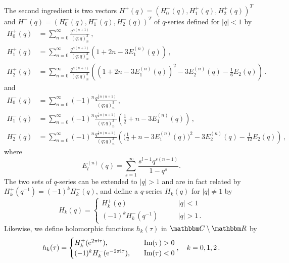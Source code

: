 \documentclass[12pt,reqno]{amsart}
\theoremstyle{definition}
\def\BR{\mathbbm R}
\def\BC{\mathbbm C}
\def\ri{\mathrm{i}}
\def\re{{\rm e}}
\def\ri{{\rm i}}
\def\Im{\mathrm{Im}}
\begin{document}
The second ingredient is two vectors
$H^+(q)= (H^+_0(q), H^+_1(q), H^+_2(q))^T$ and
$H^-(q) = (H^-_0(q),H^-_1(q),H^-_2(q))^T$ of $q$-series defined for
$|q|<1$ by
\begin{subequations}
\begin{align}
\label{Hp0}
  H^+_0(q)
  &=\sum_{n=0}^\infty \frac{q^{n(n+1)}}{(q;q)_n^3}\,,
\\
\label{Hp1}
  H^+_1(q)
  &=\sum_{n=0}^\infty \frac{q^{n(n+1)}}{(q;q)_n^3}
    \left(1+2n-3E_1^{(n)}(q)\right) \,,
  \\
  \label{Hp2}
  H^+_2(q)
  &=\sum_{n=0}^\infty \frac{q^{n(n+1)}}{(q;q)_n^3}
    \left((1+2n-3E_1^{(n)}(q))^2-3E_2^{(n)}(q)-\frac{1}{6}E_2(q)\right) \,.
\end{align}
\end{subequations}
and
\begin{subequations}
\begin{align}
\label{Hn0}
  H^-_0(q)
  &=\sum_{n=0}^\infty (-1)^n\frac{q^{\frac{1}{2}n(n+1)}}{(q;q)_n^3}\,,
\\
\label{Hn1}
  H^-_1(q)
  &=\sum_{n=0}^\infty (-1)^n\frac{q^{\frac{1}{2}n(n+1)}}{(q;q)_n^3}
    \left(\frac{1}{2}+n-3E_1^{(n)}(q)\right) \,,
  \\
  \label{Hn2}
  H^-_2(q)
  &=\sum_{n=0}^\infty (-1)^n\frac{q^{\frac{1}{2}n(n+1)}}{(q;q)_n^3}
  \left(\big(\frac{1}{2}+n-3E_1^{(n)}(q)\big)^2
    -3E_2^{(n)}(q)-\frac{1}{12}E_2(q)\right) \,,
\end{align}
\end{subequations}
where
\begin{equation}
  E_l^{(n)}(q) = \sum_{s=1}^\infty \frac{s^{l-1}q^{s(n+1)}}{1-q^s}.
  \label{eq:Eln}
\end{equation}
The two sets of $q$-series can be extended to $|q|>1$ and are in fact
related by $H^+_k(q^{-1})=(-1)^k H^-_k(q)$, and define a $q$-series
$H_k(q)$ for $|q| \neq 1$ by
\begin{equation}
  H_k(q) = \begin{cases}
    H^+_k(q) & \qquad |q|<1 \\
    (-1)^k H^-_k(q^{-1}) & \qquad |q|>1 \,.
  \end{cases}
\end{equation}
Likewise, we define holomorphic functions $h_k(\tau)$ in $\BC\setminus\BR$ by
\begin{equation}
  h_k(\tau) =
  \begin{cases}
    H^+_k(\re^{2\pi\ri \tau}), & \quad \Im(\tau) > 0\\
    (-1)^k H^-_k(\re^{-2\pi\ri \tau}), & \quad \Im(\tau) <0
  \end{cases}, \quad k=0,1,2\,. 
\end{equation}
\end{document}
